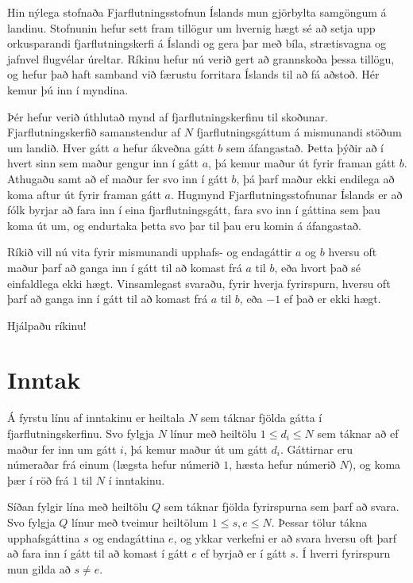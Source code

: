 
Hin nýlega stofnaða Fjarflutningsstofnun Íslands mun gjörbylta samgöngum á
landinu. Stofnunin hefur sett fram tillögur um hvernig hægt sé að setja upp
orkusparandi fjarflutningskerfi á Íslandi og gera þar með bíla, strætisvagna og
jafnvel flugvélar úreltar. Ríkinu hefur nú verið gert að grannskoða þessa
tillögu, og hefur það haft samband við færustu forritara Íslands til að fá
aðstoð. Hér kemur þú inn í myndina.

Þér hefur verið úthlutað mynd af fjarflutningskerfinu til skoðunar.
Fjarflutningskerfið samanstendur af $N$ fjarflutningsgáttum á mismunandi stöðum
um landið. Hver gátt $a$ hefur ákveðna gátt $b$ sem áfangastað. Þetta þýðir að
í hvert sinn sem maður gengur inn í gátt $a$, þá kemur maður út fyrir framan
gátt $b$. Athugaðu samt að ef maður fer svo inn í gátt $b$, þá þarf maður ekki
endilega að koma aftur út fyrir framan gátt $a$. Hugmynd Fjarflutningsstofnunar
Íslands er að fólk byrjar að fara inn í eina fjarflutningsgátt, fara svo inn í
gáttina sem þau koma út um, og endurtaka þetta svo þar til þau eru komin á
áfangastað.

Ríkið vill nú vita fyrir mismunandi upphafs- og endagáttir $a$ og $b$ hversu
oft maður þarf að ganga inn í gátt til að komast frá $a$ til $b$, eða hvort það
sé einfaldlega ekki hægt. Vinsamlegast svaraðu, fyrir hverja fyrirspurn, hversu
oft þarf að ganga inn í gátt til að komast frá $a$ til $b$, eða $-1$ ef það er
ekki hægt.

Hjálpaðu ríkinu!

\section*{Inntak}
Á fyrstu línu af inntakinu er heiltala $N$ sem táknar fjölda gátta í
fjarflutningskerfinu. Svo fylgja $N$ línur með heiltölu $1 \leq d_i \leq N$ sem
táknar að ef maður fer inn um gátt $i$, þá kemur maður út um gátt $d_i$.
Gáttirnar eru númeraðar frá einum (lægsta hefur númerið $1$, hæsta hefur
númerið $N$), og koma þær í röð frá $1$ til $N$ í inntakinu.

Síðan fylgir lína með heiltölu $Q$ sem táknar fjölda fyrirspurna sem þarf að
svara. Svo fylgja $Q$ línur með tveimur heiltölum $1 \leq s, e \leq N$. Þessar
tölur tákna upphafsgáttina $s$ og endagáttina $e$, og ykkar verkefni er að
svara hversu oft þarf að fara inn í gátt til að komast í gátt $e$ ef byrjað er
í gátt $s$. Í hverri fyrirspurn mun gilda að $s \neq e$.


